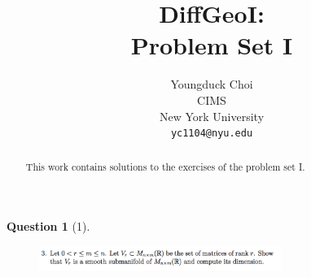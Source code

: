 \documentclass{article} %
\title{DiffGeoI: \\
Problem Set I}
\author{
Youngduck Choi \\
CIMS \\
New York University\\
\texttt{yc1104@nyu.edu} \\
}
\theoremstyle{quest}
\newtheorem*{question}{Question}
\begin{document}
\maketitle

\begin{abstract}
This work contains solutions to the exercises of the problem set I.
\end{abstract}

\bigskip

\begin{question}[1]
\hfill
\begin{figure}[h!]
  \centering
    \includegraphics[width=0.7\textwidth]{geo-2-1.png}
\end{figure}
\end{question}
\end{document}

